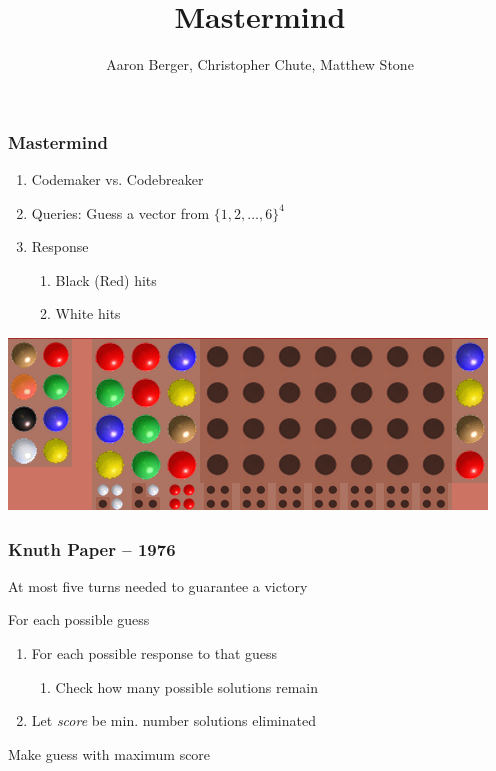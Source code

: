 \documentclass{beamer}
\title{Mastermind}
\author{Aaron Berger, Christopher Chute, Matthew Stone}
\begin{document}
    \begin{frame}
    	\maketitle
    \end{frame}

    \begin{frame}
    	\frametitle{Mastermind}
	   	\begin{enumerate}[label=\roman*.]
	    \item Codemaker vs. Codebreaker
	    \item Queries: Guess a vector from $\{1,2,\ldots,6\}^4$
	    \item Response
	    	\begin{enumerate}[label=\roman*.]
			\item Black (Red) hits
			\item White hits
			\end{enumerate}
   	    \end{enumerate}
	    \begin{center}
	    \includegraphics[width=.65\textwidth, keepaspectratio=true]{mm.png}
	    \end{center}
    \end{frame}

    \begin{frame}
    	\frametitle{Knuth Paper -- 1976}
		At most five turns needed to guarantee a victory\vspace{\baselineskip}
		\begin{tcolorbox}[colback=green!5,colframe=green!40!black,title=Minimax]
		For each possible guess
			\begin{enumerate}[label=]
			\item For each possible response to that guess
				\begin{enumerate}[label=]
				\item Check how many possible solutions remain
				\end{enumerate}
			\item Let \textit{score} be min. number solutions eliminated
			\end{enumerate}
		Make guess with maximum score
		\end{tcolorbox}
    \end{frame}
 
\end{document}
